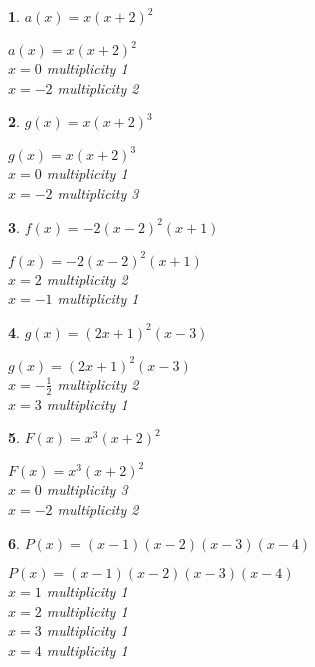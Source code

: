 \documentclass{amsbook}
\newtheorem{exc}{}
\newenvironment{ex}{\begin{exc}\normalfont}{\end{exc}}
\numberwithin{section}{chapter}
\numberwithin{equation}{chapter}
\begin{document}
\begin{multicols}{2}

\begin{ex}
	$a(x) = x(x + 2)^{2}$
	\begin{sol}
		$a(x) = x(x + 2)^{2}$\\
		$x = 0$ multiplicity 1\\
		$x = -2$ multiplicity 2
	\end{sol}
\end{ex}

\begin{ex}
	$g(x) = x(x + 2)^{3}$
	\begin{sol}
		$g(x) = x(x + 2)^{3}$\\
		$x = 0$ multiplicity 1\\
		$x = -2$ multiplicity 3
	\end{sol}
\end{ex}

\begin{ex}
	 $f(x) = -2(x-2)^2(x+1)$
	\begin{sol}
		$f(x) = -2(x-2)^2(x+1)$\\
		$x=2$ multiplicity 2 \\
		$x=-1$ multiplicity 1
	\end{sol}
\end{ex}

\begin{ex}
$g(x) = (2x+1)^2(x-3)$	
	\begin{sol}
		$g(x) = (2x+1)^2(x-3)$\\
		$x=-\frac{1}{2}$ multiplicity 2 \\
		$x=3$ multiplicity 1
	\end{sol}
\end{ex}

\begin{ex}
	$F(x) = x^{3}(x + 2)^{2}$
	\begin{sol}
		$F(x) = x^{3}(x + 2)^{2}$\\
		$x = 0$ multiplicity 3\\
		$x = -2$ multiplicity 2
	\end{sol}
\end{ex}

\begin{ex}
	$P(x) = (x - 1)(x - 2)(x - 3)(x - 4)$
	\begin{sol}
		$P(x) = (x - 1)(x - 2)(x - 3)(x - 4)$\\
		$x = 1$ multiplicity 1\\
		$x = 2$ multiplicity 1\\
		$x = 3$ multiplicity 1\\
		$x = 4$ multiplicity 1
	\end{sol}
\end{ex}


\end{multicols}
\end{document}
